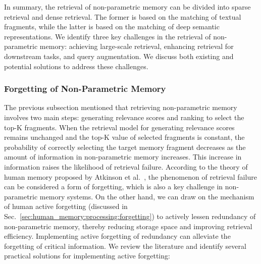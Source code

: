 \documentclass[journal,hideappendix]{vgtc}
\begin{document}
In summary, the retrieval of non-parametric memory can be divided into sparse retrieval and dense retrieval. 
The former is based on the matching of textual fragments, while the latter is based on the matching of deep semantic representations. 
We identify three key challenges in the retrieval of non-parametric memory: achieving large-scale retrieval, enhancing retrieval for downstream tasks, and query augmentation. We discuss both existing and potential solutions to address these challenges.


\subsubsection{Forgetting of Non-Parametric Memory}
\label{sec:AI_memory:non_parametric:memory_forgetting}

The previous subsection mentioned that retrieving non-parametric memory involves two main steps: generating relevance scores and ranking to select the top-K fragments. When the retrieval model for generating relevance scores remains unchanged and the top-K value of selected fragments is constant, the probability of correctly selecting the target memory fragment decreases as the amount of information in non-parametric memory increases. This increase in information raises the likelihood of retrieval failure. 
According to the theory of human memory proposed by Atkinson et al.~\cite{shiffrin1969memory}, the phenomenon of retrieval failure can be considered a form of forgetting, which is also a key challenge in non-parametric memory systems. On the other hand, we can draw on the mechanism of human active forgetting (discussed in Sec.~\ref{sec:human_memory:processing:forgetting}) to actively lessen redundancy of non-parametric memory, thereby reducing storage space and improving retrieval efficiency. Implementing active forgetting of redundancy can alleviate the forgetting of critical information. We review the literature and
identify several practical solutions for implementing active forgetting:
\end{document}
